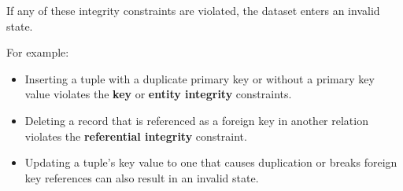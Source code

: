 If any of these integrity constraints are violated, the dataset enters an invalid state.  

For example:
\begin{itemize}
  \item Inserting a tuple with a duplicate primary key or without a primary key value violates the \textbf{key} or \textbf{entity integrity} constraints.  
  \item Deleting a record that is referenced as a foreign key in another relation violates the \textbf{referential integrity} constraint.  
  \item Updating a tuple’s key value to one that causes duplication or breaks foreign key references can also result in an invalid state.  
\end{itemize}
